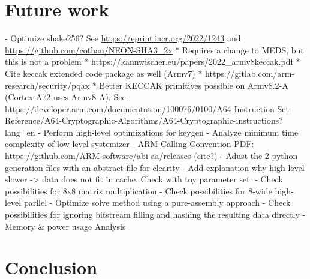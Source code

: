 \documentclass[11pt,a4paper]{report}
\theoremstyle{definition}
\begin{document}


\chapter{Future work}
\label{ch:futurework}
- Optimize shake256? See \url{https://eprint.iacr.org/2022/1243} and \url{https://github.com/cothan/NEON-SHA3\_2x}
  * Requires a change to MEDS, but this is not a problem
  * https://kannwischer.eu/papers/2022\_armv8keccak.pdf
  * Cite keccak extended code package as well (Armv7)
  * https://gitlab.com/arm-research/security/pqax
  * Better KECCAK primitives possible on Armv8.2-A (Cortex-A72 uses Armv8-A). See: https://developer.arm.com/documentation/100076/0100/A64-Instruction-Set-Reference/A64-Cryptographic-Algorithms/A64-Cryptographic-instructions?lang=en
- Perform high-level optimizations for keygen
- Analyze minimum time complexity of low-level systemizer
- ARM Calling Convention PDF: https://github.com/ARM-software/abi-aa/releases (cite?)
- Adust the 2 python generation files with an abstract file for clearity
- Add explanation why high level slower -> data does not fit in cache. Check with toy parameter set.
- Check possibilities for 8x8 matrix multiplication
- Check possibilities for 8-wide high-level parllel
- Optimize solve method using a pure-assembly approach
- Check possibilities for ignoring bitstream filling and hashing the resulting data directly
- Memory \& power usage Analysis

\chapter{Conclusion}
\label{ch:conclusion}




\appendix


\end{document}
